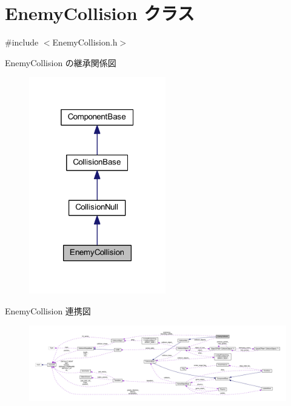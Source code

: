 \hypertarget{class_enemy_collision}{}\section{Enemy\+Collision クラス}
\label{class_enemy_collision}


{\ttfamily \#include $<$Enemy\+Collision.\+h$>$}



Enemy\+Collision の継承関係図\nopagebreak
\begin{figure}[H]
\begin{center}
\leavevmode
\includegraphics[width=169pt]{class_enemy_collision__inherit__graph}
\end{center}
\end{figure}


Enemy\+Collision 連携図\nopagebreak
\begin{figure}[H]
\begin{center}
\leavevmode
\includegraphics[width=350pt]{class_enemy_collision__coll__graph}
\end{center}
\end{figure}

